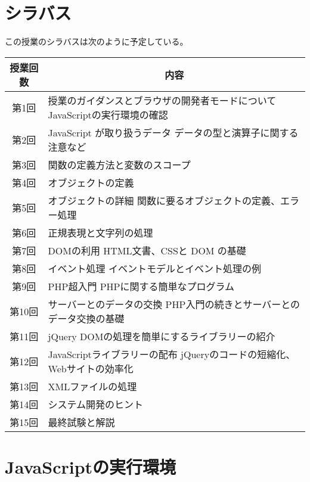 \section{シラバス}
この授業のシラバスは次のように予定している。
\begin{center}
\begin{tabular}{|c|m{}|}\hline
 授業回数&\multicolumn{1}{c|}{内容}\\\hline
 第1回&授業のガイダンスとブラウザの開発者モードについて \newline
     JavaScriptの実行環境の確認\\\hline
 第2回&JavaScript が取り扱うデータ\newline
     データの型と演算子に関する注意など\\\hline
 第3回& 関数の定義方法と変数のスコープ\\\hline
 第4回& オブジェクトの定義\\\hline
 第5回&オブジェクトの詳細\newline
     関数に要るオブジェクトの定義、エラー処理\\\hline
 第6回&正規表現と文字列の処理  \\\hline
 第7回&DOMの利用\newline
     HTML文書、CSSと DOM の基礎\\\hline
 第8回&イベント処理 \newline
     イベントモデルとイベント処理の例\\\hline
 第9回&PHP超入門\newline
       PHPに関する簡単なプログラム\\\hline
 第10回&サーバーとのデータの交換\newline
     PHP入門の続きとサーバーとのデータ交換の基礎\\\hline
 第11回&jQuery \newline
     DOMの処理を簡単にするライブラリーの紹介\\   \hline
 第12回&JavaScriptライブラリーの配布\newline
     jQueryのコードの短縮化、Webサイトの効率化 \\\hline
 第13回&XMLファイルの処理\\\hline
 第14回&システム開発のヒント\\\hline
 第15回&最終試験と解説\\ \hline
\end{tabular}
\end{center}
\section{JavaScriptの実行環境}

